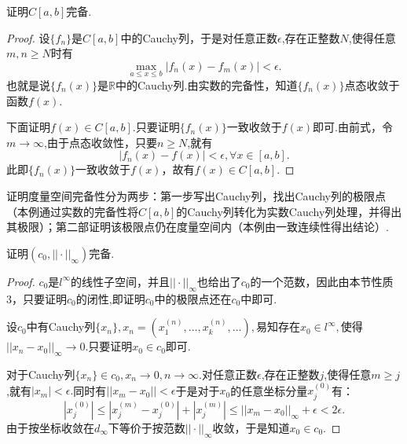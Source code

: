\documentclass[lang=cn,10pt]{elegantbook}
\begin{document}
	\begin{example}
		证明\(C[a,b]\)完备.
		\begin{proof}
			设\(\{f_n\}\)是\(C[a,b]\)中的Cauchy列，于是对任意正数\(\epsilon\),存在正整数\(N\),使得任意\(m,n \ge N\)时有
			\[\max_{a \le x \le b}|f_n(x)-f_m(x)|<\epsilon.\]
			也就是说\(\{f_n(x)\}\)是\(\mathbb{R}\)中的Cauchy列.由实数的完备性，知道\(\{f_n(x)\}\)点态收敛于函数\(f(x).\)
			
			下面证明\(f(x)\in C[a,b].\)只要证明\(\{f_n(x)\}\)一致收敛于\(f(x)\)即可.由前式，令\(m \to \infty\),由于点态收敛性，只要\(n \ge N\),就有
			\[|f_n(x)-f(x)|<\epsilon,\forall x \in [a,b].\]
			此即\(\{f_n(x)\}\)一致收敛于\(f(x)\)，故有\(f(x)\in C[a,b].\)
		\end{proof}
		\begin{note}
			证明度量空间完备性分为两步：第一步写出Cauchy列，找出Cauchy列的极限点（本例通过实数的完备性将\(C[a,b]\)的Cauchy列转化为实数Cauchy列处理，并得出其极限）；第二部证明该极限点仍在度量空间内（本例由一致连续性得出结论）.
		\end{note}
	\end{example}
	
	\begin{example}
		证明\((c_0,||\cdot||_\infty)\)完备.
		\begin{proof}
			\(c_0\)是\(l^\infty\)的线性子空间，并且\(||\cdot||_\infty\)也给出了\(c_0\)的一个范数，因此由本节性质3，只要证明\(c_0\)的闭性,即证明\(c_0\)中的极限点还在\(c_0\)中即可.
			
			设\(c_0\)中有Cauchy列\(\{x_n\},x_n=(x_1^{(n)},\dots,x_k^{(n)},\dots),\)易知存在\(x_0 \in l^\infty,\)使得\(||x_n-x_0||_\infty\to 0.\)只要证明\(x_0\in c_0\)即可.
			
			对于Cauchy列\(\{x_n\}\in c_0,x_n\to 0,n \to \infty.\)对任意正数\(\epsilon\),存在正整数\(j\),使得任意\(m \ge j\),就有\(|x_m|< \epsilon.\)同时有\(||x_m-x_0||<\epsilon\)于是对于\(x_0\)的任意坐标分量\(x_j^{(0)}\)有：
			\[|x_j^{(0)}|\le |x_j^{(m)}-x_j^{(0)}|+|x_j^{(m)}|\le ||x_m-x_0||_\infty+\epsilon< 2\epsilon.\]
			由于按坐标收敛在\(d_\infty\)下等价于按范数\(||\cdot||_\infty\)收敛，于是知道\(x_0\in c_0.\)
		\end{proof}
	\end{example}
	
\end{document}
